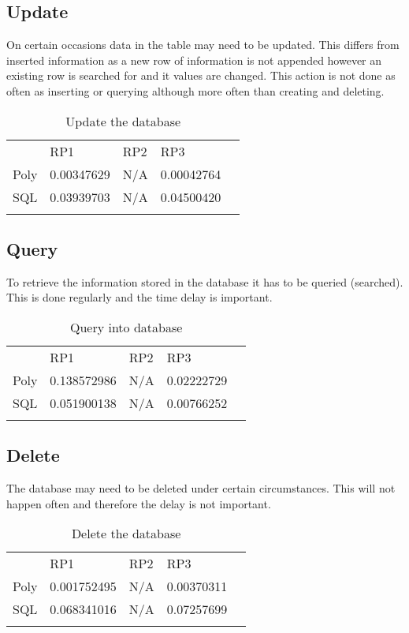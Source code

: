 \subsection{Update}
On certain occasions data in the table may need to be updated. This differs from inserted information as a new row of information is not appended however an existing row is searched for and it values are changed. This action is not done as often as inserting or querying although more often than creating and deleting.
\begin{table}[!htb]
\centering
\caption{Update the database}
\label{Update}
\begin{tabular}{lllll}
     & RP1         & RP2 & RP3 &  \\
Poly & 0.00347629 & N/A    & 0.00042764    &  \\
SQL  & 0.03939703 & N/A    & 0.04500420    &  \\
     &             &     &     & 
\end{tabular}
\end{table}

\subsection{Query}
To retrieve the information stored in the database it has to be queried (searched). This is done regularly and the time delay is important.
\begin{table}[!htb]
\centering
\caption{Query into database}
\label{Query}
\begin{tabular}{lllll}
     & RP1         & RP2 & RP3 &  \\
Poly & 0.138572986 & N/A    & 0.02222729 &  \\
SQL  & 0.051900138 & N/A    & 0.00766252 &  \\
     &             &     &     & 
\end{tabular}
\end{table}

\subsection{Delete}
The database may need to be deleted under certain circumstances. This will not happen often and therefore the delay is not important.
\begin{table}[!htb]
\centering
\caption{Delete the database}
\label{Delete}
\begin{tabular}{lllll}
     & RP1         & RP2 & RP3 &  \\
Poly & 0.001752495 & N/A    & 0.00370311    &  \\
SQL  & 0.068341016 & N/A    & 0.07257699    &  \\
     &             &     &     & 
\end{tabular}
\end{table}


\iffalse
The chosen RPi we are using is ...
For this RPi this bar graph which seperate bar for each operation and shaded for sql and unshaded for poly.
\fi